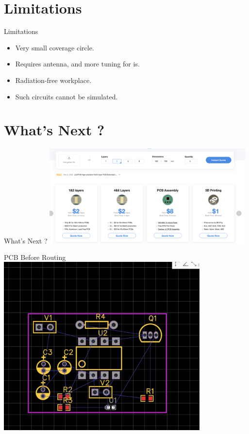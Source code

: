 \documentclass{loyola-beamer}
\begin{document}
\section{Limitations}

\begin{frame}{Limitations}
	\begin{itemize}
		\item Very small coverage circle.
		\item Requires antenna, and more tuning for is.
		\item Radiation-free workplace.
		\item Such circuits cannot be simulated.
	\end{itemize}
\end{frame}

\section{What's Next ?}

\begin{frame}{What's Next ?}
	\includegraphics[width=0.8\textwidth]{../PCB-printer.png}
\end{frame}

\begin{frame}{PCB Before Routing}
	\includegraphics[width=0.8\textwidth]{../PCB-before.png}
\end{frame}
\end{document}

